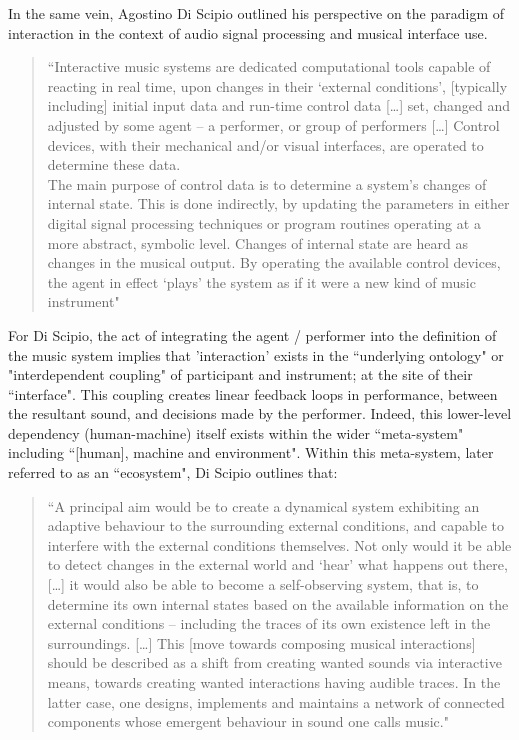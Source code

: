 In the same vein, Agostino Di Scipio outlined his perspective on the paradigm of interaction in the context of audio signal processing and musical interface use.  
\begin{quote}
    ``Interactive music systems are dedicated computational tools capable of reacting in real time, upon changes in their `external conditions', [typically including] initial input data and run-time control data […] set, changed and adjusted by some agent – a performer, or group of performers […] Control devices, with their mechanical and/or visual interfaces, are operated to determine these data.\\ 
    The main purpose of control data is to determine a system's changes of internal state. This is done indirectly, by updating the parameters in either digital signal processing techniques or program routines operating at a more abstract, symbolic level. Changes of internal state are heard as changes in the musical output. By operating the available control devices, the agent in effect `plays' the system as if it were a new kind of music instrument" \citeyearpar[p. 1]{discipio2003}
\end{quote}
For Di Scipio, the act of integrating the agent / performer into the definition of the music system implies that 'interaction' exists in the ``underlying ontology" or "interdependent coupling" of participant and instrument; at the site of their ``interface". This coupling creates linear feedback loops in performance, between the resultant sound, and decisions made by the performer. Indeed, this lower-level dependency (human-machine) itself exists within the wider ``meta-system" including ``[human], machine and environment". Within this meta-system, later referred to as an ``ecosystem", Di Scipio outlines that:
\begin{quote}
    ``A principal aim would be to create a dynamical system exhibiting an adaptive behaviour to the surrounding external conditions, and capable to interfere with the external conditions themselves. Not only would it be able to detect changes in the external world and `hear' what happens out there, […] it would also be able to become a self-observing system, that is, to determine its own internal states based on the available information on the external conditions – including the traces of its own existence left in the surroundings. […] This [move towards composing musical interactions] should be described as a shift from creating wanted sounds via interactive means, towards creating wanted interactions having audible traces. In the latter case, one designs, implements and maintains a network of connected components whose emergent behaviour in sound one calls music." \citeyearpar[p. 6]{discipio2003}
\end{quote}
